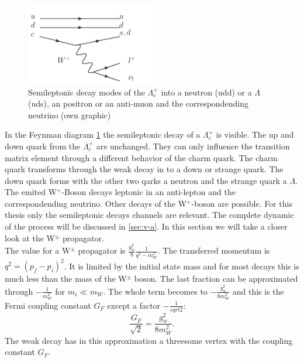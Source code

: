 \begin{figure}[h]
  \centering
  \includegraphics[page=1, width=0.5\textwidth]{semileptonic_lambdac+}
  \caption{Semileptonic decay modes of the \(\Lambda_c^+\) into a neutron (udd)
    or a \(\Lambda\) (uds), an positron or an anti-muon and the correspondending 
  neutrino (own graphic)}\label{fey:lambda}
\end{figure}

In the Feynman diagram {\ref{fey:lambda}} the semileptonic decay of a \(\Lambda_c^+\) 
is visible. The up and down quark from the \(\Lambda_c^+\) are unchanged. 
They can only influence the transition matrix element through a different 
behavior of the charm quark. The charm quark transforms through the weak 
decay in to a down or strange quark. The down quark forms with the other two 
qarks a neutron and the strange quark a \(\Lambda\). The emited W\(^+\)-Boson 
decays leptonic in an anti-lepton and the correspondending neutrino.
Other decays of the W\(^+\)-boson are possible. For this thesis only the 
semileptonic decays channels are relevant. The complete dynamic of the process 
will be discussed in {\ref{sec:v-a}}. In this section we will take a closer 
look at the W\(^\pm\) propagator.\\
The value for a W\(^\pm\) propagator is \(\frac{g_w^2}{8}\frac{1}{q^2 - m_W^2}\).
The transferred momentum is \(q^2 = \left(p_f - p_i\right)^2\). It is limited 
by the initial state mass and for most decays this is much less than the mass 
of the W\(^\pm\) boson. The last fraction can be approximated through 
\(-\frac{1}{m_W^2}\) for \(m_i \ll m_W\). The whole term becomes to \(-\frac{g_w^2}{8 m_W^2}\) 
and this is the Fermi coupling constant \(G_F\) except a factor \(-\frac{1}{sqrt{2}}\):
\begin{equation}
  \frac{G_F}{\sqrt{2}} = \frac{g_w^2}{8 m_W^2}. \nonumber
\end{equation}
The weak decay has in this approximation a threesome vertex with the coupling 
constant \(G_F\).

